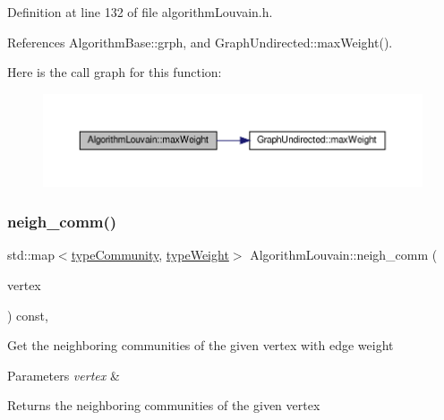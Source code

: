 Definition at line 132 of file algorithm\+Louvain.\+h.



References Algorithm\+Base\+::grph, and Graph\+Undirected\+::max\+Weight().

Here is the call graph for this function\+:
\nopagebreak
\begin{figure}[H]
\begin{center}
\leavevmode
\includegraphics[width=350pt]{classAlgorithmLouvain_a0b2ef33d5d1bf8b9aa2f8c73921844ac_cgraph}
\end{center}
\end{figure}
\mbox{\label{classAlgorithmLouvain_a78dfa81bd96f4036e44c17318501b6b7}} 
\subsubsection{\texorpdfstring{neigh\+\_\+comm()}{neigh\_comm()}}
{\footnotesize\ttfamily std\+::map$<$\hyperlink{graphUndirectedGroupable_8h_a914da95c9ea7f14f4b7f875c36818556}{type\+Community}, \hyperlink{edge_8h_a2e7ea3be891ac8b52f749ec73fee6dd2}{type\+Weight}$>$ Algorithm\+Louvain\+::neigh\+\_\+comm (\begin{DoxyParamCaption}\item[{const \hyperlink{edge_8h_a5fbd20c46956d479cb10afc9855223f6}{type\+Vertex} \&}]{vertex }\end{DoxyParamCaption}) const\hspace{0.3cm}{\ttfamily [inline]}, {\ttfamily [private]}}

Get the neighboring communities of the given vertex with edge weight


\begin{DoxyParams}{Parameters}
{\em vertex} & \\
\hline
\end{DoxyParams}
\begin{DoxyReturn}{Returns}
the neighboring communities of the given vertex 
\end{DoxyReturn}


